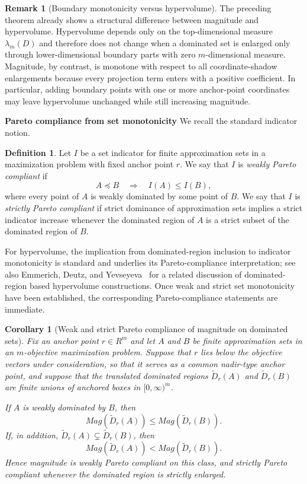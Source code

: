 \documentclass{article}
\def\Mag{Mag}%
\def\R{R}%
\newtheorem{corollary}[theorem]{Corollary}
\theoremstyle{definition}
\newtheorem{definition}[theorem]{Definition}
\newtheorem{remark}[theorem]{Remark}
\newcommand{\Mag}{\operatorname{Mag}}
\newcommand{\R}{\mathbb{R}}
\newcommand{\1}{\mathbf{1}}
\newcommand{\myparagraph}[1]{\medskip\noindent\textbf{#1}}
\begin{document}
\begin{remark}[Boundary monotonicity versus hypervolume]
The preceding theorem already shows a structural difference between magnitude and hypervolume. Hypervolume depends only on the top-dimensional measure $\lambda_m(D)$ and therefore does not change when a dominated set is enlarged only through lower-dimensional boundary parts with zero $m$-dimensional measure. Magnitude, by contrast, is monotone with respect to all coordinate-shadow enlargements because every projection term enters with a positive coefficient. In particular, adding boundary points with one or more anchor-point coordinates may leave hypervolume unchanged while still increasing magnitude.
\end{remark}

\myparagraph{Pareto compliance from set monotonicity}
We recall the standard indicator notion.

\begin{definition}
Let $I$ be a set indicator for finite approximation sets in a maximization problem with fixed anchor point $r$. We say that $I$ is \emph{weakly Pareto compliant} if
\[
A \preceq B \quad\Longrightarrow\quad I(A)\le I(B),
\]
where every point of $A$ is weakly dominated by some point of $B$. We say that $I$ is \emph{strictly Pareto compliant} if strict dominance of approximation sets implies a strict indicator increase whenever the dominated region of $A$ is a strict subset of the dominated region of $B$.
\end{definition}

For hypervolume, the implication from dominated-region inclusion to indicator monotonicity is standard and underlies its Pareto-compliance interpretation; see also Emmerich, Deutz, and Yevseyeva~\cite{EmmerichDeutzYevseyeva2014} for a related discussion of dominated-region based hypervolume constructions. Once weak and strict set monotonicity have been established, the corresponding Pareto-compliance statements are immediate.

\begin{corollary}[Weak and strict Pareto compliance of magnitude on dominated sets]
Fix an anchor point $r\in\R^m$ and let $A$ and $B$ be finite approximation sets in an $m$-objective maximization problem. Suppose that $r$ lies below the objective vectors under consideration, so that it serves as a common nadir-type anchor point, and suppose that the translated dominated regions $\widetilde D_r(A)$ and $\widetilde D_r(B)$ are finite unions of anchored boxes in $[0,\infty)^m$.

If $A$ is weakly dominated by $B$, then
\[
\Mag(\widetilde D_r(A))\le \Mag(\widetilde D_r(B)).
\]
If, in addition, $\widetilde D_r(A)\subsetneq \widetilde D_r(B)$, then
\[
\Mag(\widetilde D_r(A))< \Mag(\widetilde D_r(B)).
\]
Hence magnitude is weakly Pareto compliant on this class, and strictly Pareto compliant whenever the dominated region is strictly enlarged.
\end{corollary}
\end{document}
